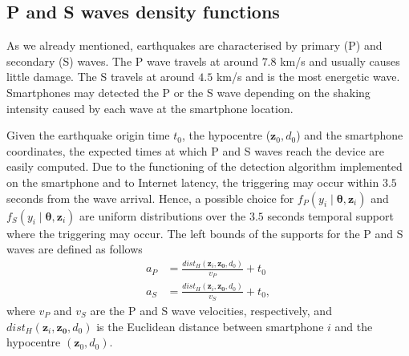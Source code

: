 \documentclass[final]{statsoc}
\newcommand{\bs}{\boldsymbol}
\begin{document}
\subsection{P and S waves density functions}
\label{sec:fitting}
As we already mentioned, earthquakes are characterised by primary (P) and secondary (S) waves. The P wave travels at around $7.8$ km/s and usually causes little damage. The S travels at around $4.5$ km/s and is the most energetic wave. Smartphones may detected the P or the S wave depending on the shaking intensity caused by each wave at the smartphone location. 

Given the earthquake origin time $t_0$, the hypocentre ($\mathbf{z}_{0},d_{0}$) and the smartphone coordinates, the expected times at which P and S waves reach the device are easily computed. Due to the functioning of the detection algorithm implemented on the smartphone and to Internet latency, the triggering may occur within $3.5$ seconds from the wave arrival. Hence, a possible choice for $f_{P}(y_{i}\mid\bs{\theta},\mathbf{z}_{i})$ and $f_{S}(y_{i}\mid\bs{\theta},\mathbf{z}_{i})$ are uniform distributions over the $3.5$ seconds temporal support where the triggering may occur. The left bounds of the supports for the P and S waves are defined as follows
%
\begin{equation*}
    \begin{aligned}
        a_{P} &= \frac{dist_{H}(\mathbf{z}_{i},\mathbf{z_{0}},d_{0})}{v_{P}} + t_{0}\\  a_{S} &= \frac{dist_{H}(\mathbf{z}_{i},\mathbf{z_{0}},d_{0})}{v_{S}} + t_{0},
    \end{aligned}
\end{equation*}
%
where $v_{P}$ and $v_{S}$ are the P and S wave velocities, respectively, and $dist_{H}(\mathbf{z}_{i},\mathbf{z_{0}},d_{0})$ is the Euclidean distance between smartphone $i$ and the hypocentre $(\mathbf{z}_{0},d_{0})$. 
\end{document}

